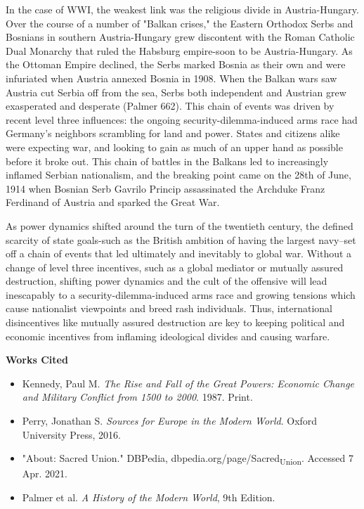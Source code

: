 \documentclass[11pt]{article}
\begin{document}
 \begin{doublespacing}

 In the case of WWI, the weakest link was the religious divide in Austria-Hungary. Over the course of a number of "Balkan crises," the Eastern Orthodox Serbs and Bosnians in southern Austria-Hungary grew discontent with the Roman Catholic Dual Monarchy that ruled the Habsburg empire-soon to be Austria-Hungary. As the Ottoman Empire declined, the Serbs marked Bosnia as their own and were infuriated when Austria annexed Bosnia in 1908. When the Balkan wars saw Austria cut Serbia off from the sea, Serbs both independent and Austrian grew exasperated and desperate (Palmer 662).
 This chain of events was driven by recent level three influences: the ongoing security-dilemma-induced arms race had Germany's neighbors scrambling for land and power. States and citizens alike were expecting war, and looking to gain as much of an upper hand as possible before it broke out.
 This chain of battles in the Balkans led to increasingly inflamed Serbian nationalism, and the breaking point came on the 28th of June, 1914 when Bosnian Serb Gavrilo Princip assassinated the Archduke Franz Ferdinand of Austria and sparked the Great War.

As power dynamics shifted around the turn of the twentieth century, the defined scarcity of state goals-such as the British ambition of having the largest navy--set off a chain of events that led ultimately and inevitably to global war. Without a change of level three incentives, such as a global mediator or mutually assured destruction, shifting power dynamics and the cult of the offensive will lead inescapably to a security-dilemma-induced arms race and growing tensions which cause nationalist viewpoints and breed rash individuals. Thus, international disincentives like mutually assured destruction are key to keeping political and economic incentives from inflaming ideological divides and causing warfare.

\end{doublespacing}

\textbf{Works Cited}
\begin{itemize}
\item Kennedy, Paul M. \emph{The Rise and Fall of the Great Powers: Economic Change and Military Conflict from 1500 to 2000}. 1987. Print.
\item Perry, Jonathan S. \emph{Sources for Europe in the Modern World}. Oxford University Press, 2016.
\item "About: Sacred Union." DBPedia, dbpedia.org/page/Sacred\textsubscript{Union}. Accessed 7 Apr. 2021.
\item Palmer et al. \emph{A History of the Modern World}, 9th Edition.
\end{itemize}
\end{document}
